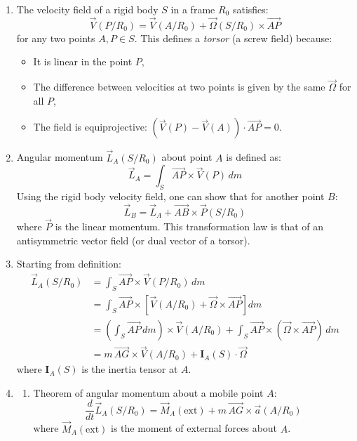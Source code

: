 \documentclass[12pt]{article}
\begin{document}
\begin{answerbox}
  \begin{enumerate}
      \item The velocity field of a rigid body \(S\) in a frame \(R_0\) satisfies:
      \[
      \vec{V}(P/R_0) = \vec{V}(A/R_0) + \vec{\Omega}(S/R_0) \times \overrightarrow{AP}
      \]
      for any two points \(A, P \in S\). This defines a \textit{torsor} (a screw field) because:
      \begin{itemize}
          \item It is linear in the point \(P\),
          \item The difference between velocities at two points is given by the same \(\vec{\Omega}\) for all \(P\),
          \item The field is equiprojective: \((\vec{V}(P) - \vec{V}(A)) \cdot \overrightarrow{AP} = 0\).
      \end{itemize}

      \item Angular momentum \(\vec{L}_A(S/R_0)\) about point \(A\) is defined as:
      \[
      \vec{L}_A = \int_S \overrightarrow{AP} \times \vec{V}(P) \, dm
      \]
      Using the rigid body velocity field, one can show that for another point \(B\):
      \[
      \vec{L}_B = \vec{L}_A + \overrightarrow{AB} \times \vec{P}(S/R_0)
      \]
      where \(\vec{P}\) is the linear momentum. This transformation law is that of an antisymmetric vector field (or dual vector of a torsor).

      \item Starting from definition:
      \begin{align*}
          \vec{L}_A(S/R_0) &= \int_S \overrightarrow{AP} \times \vec{V}(P/R_0) \, dm \\
          &= \int_S \overrightarrow{AP} \times \left[ \vec{V}(A/R_0) + \vec{\Omega} \times \overrightarrow{AP} \right] dm \\
          &= \left( \int_S \overrightarrow{AP} \, dm \right) \times \vec{V}(A/R_0) + \int_S \overrightarrow{AP} \times (\vec{\Omega} \times \overrightarrow{AP}) \, dm \\
          &= m \, \overrightarrow{AG} \times \vec{V}(A/R_0) + \mathbf{I}_A(S) \cdot \vec{\Omega}
      \end{align*}
      where \(\mathbf{I}_A(S)\) is the inertia tensor at \(A\).

      \item 
      \begin{enumerate}
          \item Theorem of angular momentum about a mobile point \(A\):
          \[
          \frac{d}{dt} \vec{L}_A(S/R_0) = \vec{M}_A(\text{ext}) + m \, \overrightarrow{AG} \times \vec{a}(A/R_0)
          \]
          where \(\vec{M}_A(\text{ext})\) is the moment of external forces about \(A\).


\end{enumerate}
\end{enumerate}
\end{answerbox}
\end{document}
